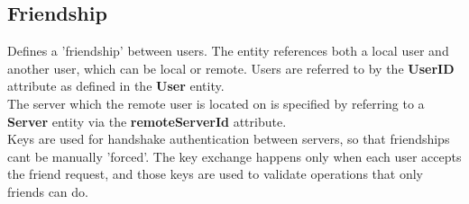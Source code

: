\subsection{Friendship}
Defines a 'friendship' between users. The entity references both a local user and another user, which can be local or remote. Users are referred to by the \textbf{UserID} attribute as defined in the \textbf{User} entity.
\\The server which the remote user is located on is specified by referring to a \textbf{Server} entity via the \textbf{remoteServerId} attribute.
\\Keys are used for handshake authentication between servers, so that friendships cant be manually 'forced'. The key exchange happens only when each user accepts the friend request, and those keys are used to validate operations that only friends can do.
